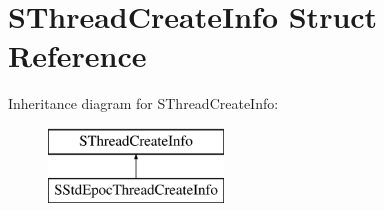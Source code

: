\hypertarget{struct_s_thread_create_info}{}\section{S\+Thread\+Create\+Info Struct Reference}
\label{struct_s_thread_create_info}
Inheritance diagram for S\+Thread\+Create\+Info\+:\begin{figure}[H]
\begin{center}
\leavevmode
\includegraphics[height=2.000000cm]{struct_s_thread_create_info}
\end{center}
\end{figure}
